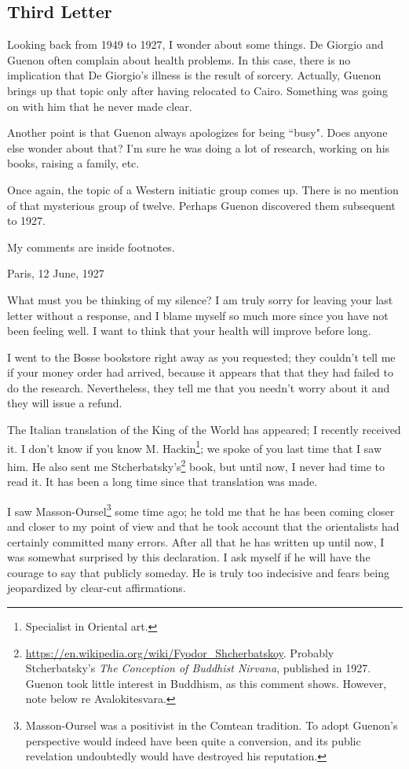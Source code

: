 \subsection{Third Letter}

\begin{quotex}
Looking back from 1949 to 1927, I wonder about some things. De Giorgio and Guenon often complain about health problems. In this case, there is no implication that De Giorgio's illness is the result of sorcery. Actually, Guenon brings up that topic only after having relocated to Cairo. Something was going on with him that he never made clear.

Another point is that Guenon always apologizes for being ``busy". Does anyone else wonder about that? I'm sure he was doing a lot of research, working on his books, raising a family, etc. 

Once again, the topic of a Western initiatic group comes up. There is no mention of that mysterious group of twelve. Perhaps Guenon discovered them subsequent to 1927.

My comments are inside footnotes.

\end{quotex}
Paris, 12 June, 1927

What must you be thinking of my silence? I am truly sorry for leaving your last letter without a response, and I blame myself so much more since you have not been feeling well. I want to think that your health will improve before long.

I went to the Bosse bookstore right away as you requested; they couldn't tell me if your money order had arrived, because it appears that that they had failed to do the research. Nevertheless, they tell me that you needn't worry about it and they will issue a refund.

The Italian translation of the King of the World has appeared; I recently received it. I don't know if you know M. Hackin\footnote{Specialist in Oriental art.}; we spoke of you last time that I saw him. He also sent me Stcherbatsky's\footnote{\url{https://en.wikipedia.org/wiki/Fyodor_Shcherbatskoy}. Probably Stcherbatsky's \emph{The Conception of Buddhist Nirvana}, published in 1927. Guenon took little interest in Buddhism, as this comment shows. However, note below re Avalokitesvara.} book, but until now, I never had time to read it. It has been a long time since that translation was made.

I saw Masson-Oursel\footnote{Masson-Oursel was a positivist in the Comtean tradition. To adopt Guenon's perspective would indeed have been quite a conversion, and its public revelation undoubtedly would have destroyed his reputation.} some time ago; he told me that he has been coming closer and closer to my point of view and that he took account that the orientalists had certainly committed many errors. After all that he has written up until now, I was somewhat surprised by this declaration. I ask myself if he will have the courage to say that publicly someday. He is truly too indecisive and fears being jeopardized by clear-cut affirmations.

